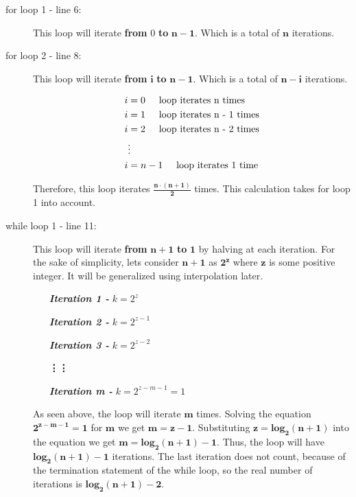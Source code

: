 \documentclass[10pt]{article}
\begin{document}
\begin{description}
   \item[for loop 1 - line 6:] This loop will iterate \textbf{from} $0$ \textbf{to}  $\mathbf{n-1}$. Which is a total of $\mathbf{n}$ iterations. 
   
   \item[for loop 2 - line 8:] This loop will iterate \textbf{from} $\mathbf{i}$ \textbf{to}  $\mathbf{n-1}$. Which is a total of $\mathbf{n-i}$ iterations. 

    \begin{align*}
    i &= 0 \text{\hspace{0.5cm}loop iterates n times} \\
    i &= 1 \text{\hspace{0.5cm}loop iterates n - 1 times}\\
    i &= 2 \text{\hspace{0.5cm}loop iterates n - 2 times}\\
    &\vdots \\
    i &= n - 1 \text{\hspace{0.5cm}loop iterates 1 time} \\
    \end{align*}

    Therefore, this loop iterates $\mathbf{\frac{n \cdot (n+1)}{2}}$ times. This calculation takes for loop 1 into account.

   \item[while loop 1 - line 11:] This loop will iterate \textbf{from} $\mathbf{n+1}$ \textbf{to} $\mathbf{1}$ by halving at each iteration. For the sake of simplicity, lets consider $\mathbf{n+1}$ as $\mathbf{2^{z}}$ where $\mathbf{z}$ is some positive integer. It will be generalized using interpolation later.
   \begin{enumerate}[leftmargin=3cm]
       \item[\textit{\textbf{Iteration 1 -}}] ${k = 2^{z}}$
       \item[\textit{\textbf{Iteration 2 -}}] ${k = 2^{z-1}}$
       \item[\textit{\textbf{Iteration 3 -}}] ${k = 2^{z-2}}$
       \item[]\hspace{-1.5cm}\textbf{\vdots}\hspace{2cm}\textbf{\vdots}
       \item[\textit{\textbf{Iteration m -}}] ${k = 2^{z-m-1} = 1}$
   \end{enumerate}
  As seen above, the loop will iterate $\mathbf{m}$ times. Solving the equation $\mathbf{2^{z-m-1} = 1}$ for $\mathbf{m}$ we get $\mathbf{m = z - 1}$. Substituting $\mathbf{z = log_2(n+1)}$ into the equation we get $\mathbf{m = log_2(n+1) - 1}$. Thus, the loop will have $\mathbf{log_2(n+1) - 1}$ iterations. The last iteration does not count, because of the termination statement of the while loop, so the real number of iterations is $\mathbf{log_2(n+1) - 2}$.


\end{description}
\end{document}
